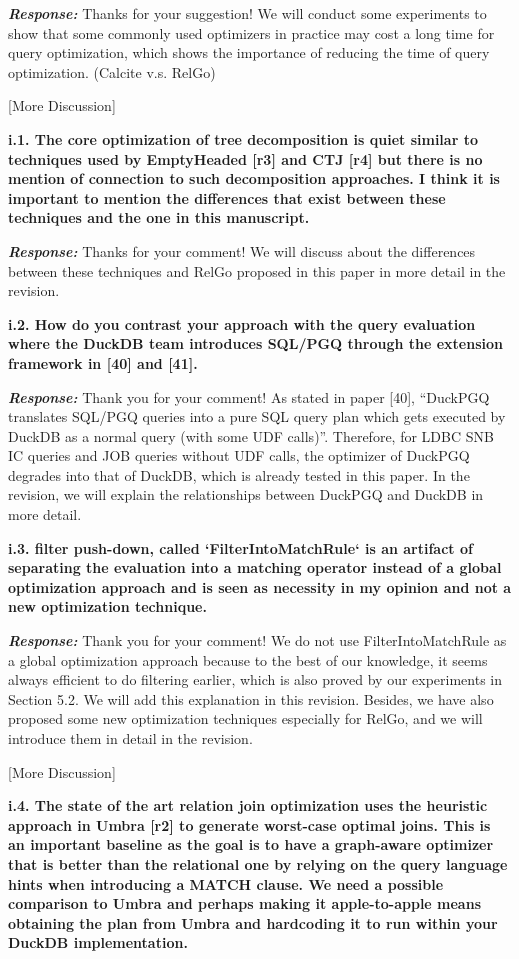 \textbf{\textit{Response: }}
Thanks for your suggestion! We will conduct some experiments to show that some commonly used optimizers in practice may cost a long time for query optimization, which shows the importance of reducing the time of query optimization. (Calcite v.s. RelGo)

[More Discussion]

\textbf{
i.1. The core optimization of tree decomposition is quiet similar to techniques used by EmptyHeaded [r3] and CTJ [r4] but there is no mention of connection to such decomposition approaches. I think it is important to mention the differences that exist between these techniques and the one in this manuscript.}

\textbf{\textit{Response: }}
Thanks for your comment! We will discuss about the differences between these techniques and RelGo proposed in this paper in more detail in the revision.


\textbf{i.2. How do you contrast your approach with the query evaluation where the DuckDB team introduces SQL/PGQ through the extension framework in [40] and [41].}

\textbf{\textit{Response: }}
Thank you for your comment! As stated in paper [40], ``DuckPGQ translates SQL/PGQ queries into a pure SQL query plan which gets executed by DuckDB as a normal query (with some UDF calls)''. Therefore, for LDBC SNB IC queries and JOB queries without UDF calls, the optimizer of DuckPGQ degrades into that of DuckDB, which is already tested in this paper. In the revision, we will explain the relationships between DuckPGQ and DuckDB in more detail.

\textbf{i.3. filter push-down, called `FilterIntoMatchRule` is an artifact of separating the evaluation into a matching operator instead of a global optimization approach and is seen as necessity in my opinion and not a new optimization technique.}

\textbf{\textit{Response: }}
Thank you for your comment! We do not use FilterIntoMatchRule as a global optimization approach because to the best of our knowledge, it seems always efficient to do filtering earlier, which is also proved by our experiments in Section 5.2. We will add this explanation in this revision.
Besides, we have also proposed some new optimization techniques especially for RelGo, and we will introduce them in detail in the revision.

[More Discussion]

\textbf{
i.4. The state of the art relation join optimization uses the heuristic approach in Umbra [r2] to generate worst-case optimal joins. This is an important baseline as the goal is to have a graph-aware optimizer that is better than the relational one by relying on the query language hints when introducing a MATCH clause. We need a possible comparison to Umbra and perhaps making it apple-to-apple means obtaining the plan from Umbra and hardcoding it to run within your DuckDB implementation.
}

